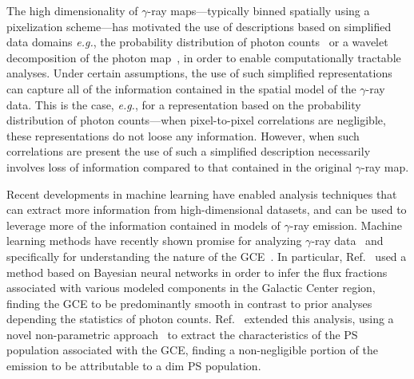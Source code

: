 \documentclass[prd,aps,10pt,nofootinbib,twocolumn,superscriptaddress,preprintnumbers,balancelastpage,longbibliography]{revtex4-1}
\begin{document}
The high dimensionality of $\gamma$-ray maps---typically binned spatially using a pixelization scheme---has motivated the use of descriptions based on simplified data domains \emph{e.g.}, the probability distribution of photon counts~\cite{Lee:2014mza,Lee:2015fea} or a wavelet decomposition of the photon map~\cite{Bartels:2015aea,Balaji:2018rwz,McDermott:2015ydv,Zhong:2019ycb}, in order to enable computationally tractable analyses. Under certain assumptions, the use of such simplified representations can capture all of the information contained in the spatial model of the $\gamma$-ray data. This is the case, \emph{e.g.}, for a representation based on the probability distribution of photon counts---when pixel-to-pixel correlations are negligible, these representations do not loose any information. However, when such correlations are present the use of such a simplified description necessarily involves loss of information compared to that contained in the original $\gamma$-ray map.

Recent developments in machine learning have enabled analysis techniques that can extract more information from high-dimensional datasets, and can be used to leverage more of the information contained in models of $\gamma$-ray emission. Machine learning methods have recently shown promise for analyzing $\gamma$-ray data~\cite{Caron:2021map} and specifically for understanding the nature of the \Fermi GCE~\cite{List:2020mzd,List:2021aer,Caron:2017udl}. In particular, Ref.~\cite{List:2020mzd} used a method based on Bayesian neural networks in order to infer the flux fractions associated with various modeled components in the Galactic Center region, finding the GCE to be predominantly smooth in contrast to prior analyses depending the statistics of photon counts. Ref.~\cite{List:2021aer} extended this analysis, using a novel non-parametric approach~\cite{list2021earth} to extract the characteristics of the PS population associated with the GCE, finding a non-negligible portion of the emission to be attributable to a dim PS population.
\end{document}
